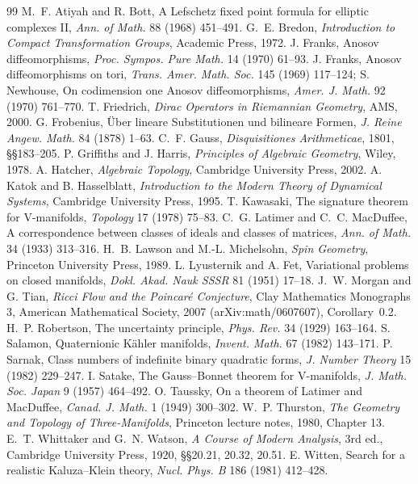 \documentclass[11pt,a4paper]{article}
\theoremstyle{plain}
\theoremstyle{definition}
\theoremstyle{remark}
\begin{document}
\begin{thebibliography}{99}
 M.~F. Atiyah and R. Bott, A Lefschetz fixed point formula for elliptic complexes II, \emph{Ann. of Math.} 88 (1968) 451--491.
 G.~E. Bredon, \emph{Introduction to Compact Transformation Groups}, Academic Press, 1972.
 J. Franks, Anosov diffeomorphisms, \emph{Proc. Sympos. Pure Math.} 14 (1970) 61--93.
 J. Franks, Anosov diffeomorphisms on tori, \emph{Trans. Amer. Math. Soc.} 145 (1969) 117--124; S. Newhouse, On codimension one Anosov diffeomorphisms, \emph{Amer. J. Math.} 92 (1970) 761--770.
 T. Friedrich, \emph{Dirac Operators in Riemannian Geometry}, AMS, 2000.
 G. Frobenius, \"Uber lineare Substitutionen und bilineare Formen, \emph{J. Reine Angew. Math.} 84 (1878) 1--63.
 C.~F. Gauss, \emph{Disquisitiones Arithmeticae}, 1801, \S\S183--205.
 P. Griffiths and J. Harris, \emph{Principles of Algebraic Geometry}, Wiley, 1978.
 A. Hatcher, \emph{Algebraic Topology}, Cambridge University Press, 2002.
 A. Katok and B. Hasselblatt, \emph{Introduction to the Modern Theory of Dynamical Systems}, Cambridge University Press, 1995.
 T. Kawasaki, The signature theorem for V-manifolds, \emph{Topology} 17 (1978) 75--83.
 C.~G. Latimer and C.~C. MacDuffee, A correspondence between classes of ideals and classes of matrices, \emph{Ann. of Math.} 34 (1933) 313--316.
 H.~B. Lawson and M.-L. Michelsohn, \emph{Spin Geometry}, Princeton University Press, 1989.
 L. Lyusternik and A. Fet, Variational problems on closed manifolds, \emph{Dokl. Akad. Nauk SSSR} 81 (1951) 17--18.
 J.~W. Morgan and G. Tian, \emph{Ricci Flow and the Poincar\'e Conjecture}, Clay Mathematics Monographs 3, American Mathematical Society, 2007 (arXiv:math/0607607), Corollary~0.2.
 H.~P. Robertson, The uncertainty principle, \emph{Phys. Rev.} 34 (1929) 163--164.
 S. Salamon, Quaternionic K\"ahler manifolds, \emph{Invent. Math.} 67 (1982) 143--171.
 P. Sarnak, Class numbers of indefinite binary quadratic forms, \emph{J. Number Theory} 15 (1982) 229--247.
 I. Satake, The Gauss--Bonnet theorem for V-manifolds, \emph{J. Math. Soc. Japan} 9 (1957) 464--492.
 O. Taussky, On a theorem of Latimer and MacDuffee, \emph{Canad. J. Math.} 1 (1949) 300--302.
 W.~P. Thurston, \emph{The Geometry and Topology of Three-Manifolds}, Princeton lecture notes, 1980, Chapter 13.
 E.~T. Whittaker and G.~N. Watson, \emph{A Course of Modern Analysis}, 3rd ed., Cambridge University Press, 1920, \S\S20.21, 20.32, 20.51.
 E. Witten, Search for a realistic Kaluza--Klein theory, \emph{Nucl. Phys. B} 186 (1981) 412--428.
\end{thebibliography}
\end{document}
